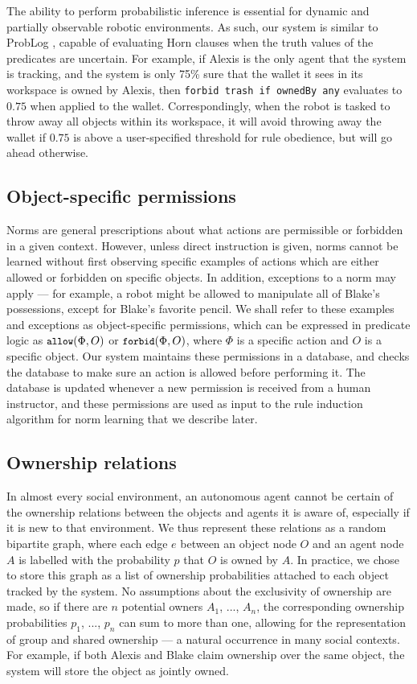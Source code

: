 \documentclass[letterpaper]{article} %
\begin{document}
The ability to perform probabilistic inference is essential for dynamic and partially observable robotic environments. As such, our system is similar to ProbLog \cite{de2007problog,de2010probabilistic}, capable of evaluating Horn clauses when the truth values of the predicates are uncertain. For example, if Alexis is the only agent that the system is tracking, and the system is only 75\% sure that the wallet it sees in its workspace is owned by Alexis, then \texttt{\small{forbid trash if ownedBy any}} evaluates to $0.75$ when applied to the wallet. Correspondingly, when the robot is tasked to throw away all objects within its workspace, it will avoid throwing away the wallet if $0.75$ is above a user-specified threshold for rule obedience, but will go ahead otherwise.

\subsection{Object-specific permissions}

Norms are general prescriptions about what actions are permissible or forbidden in a given context. However, unless direct instruction is given, norms cannot be learned without first observing specific examples of actions which are either allowed or forbidden on specific objects. In addition, exceptions to a norm may apply --- for example, a robot might be allowed to manipulate all of Blake's possessions, except for Blake's favorite pencil. We shall refer to these examples and exceptions as object-specific permissions, which can be expressed in predicate logic as $\small\texttt{allow}(\Phi, O)$ or $\small\texttt{forbid}(\Phi, O)$, where $\Phi$ is a specific action and $O$ is a specific object. Our system maintains these permissions in a database, and checks the database to make sure an action is allowed before performing it. The database is updated whenever a new permission is received from a human instructor, and these permissions are used as input to the rule induction algorithm for norm learning that we describe later.

\subsection{Ownership relations}

In almost every social environment, an autonomous agent cannot be certain of the ownership relations between the objects and agents it is aware of, especially if it is new to that environment. We thus represent these relations as a random bipartite graph, where each edge $e$ between an object node $O$ and an agent node $A$ is labelled with the probability $p$ that $O$ is owned by $A$. In practice, we chose to store this graph as a list of ownership probabilities attached to each object tracked by the system. No assumptions about the exclusivity of ownership are made, so if there are $n$ potential owners $A_1$, ..., $A_n$, the corresponding ownership probabilities $p_1$, ..., $p_n$ can sum to more than one, allowing for the representation of group and shared ownership --- a natural occurrence in many social contexts. For example, if both Alexis and Blake claim ownership over the same object, the system will store the object  as jointly owned. 
\end{document}

